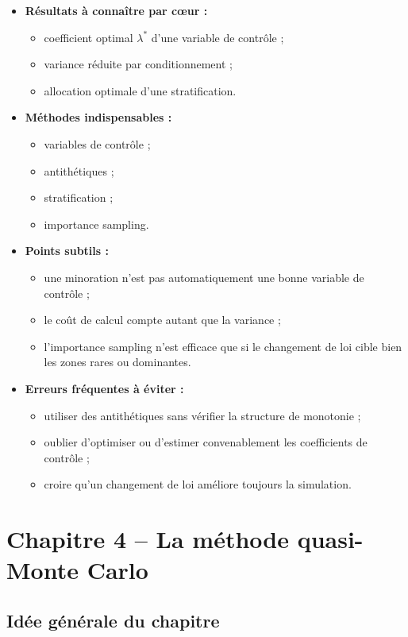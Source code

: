 \documentclass[11pt,a4paper]{article}
\begin{document}
\begin{itemize}
  \item \textbf{Résultats à connaître par cœur :}
  \begin{itemize}
    \item coefficient optimal $\lambda^\ast$ d'une variable de contrôle ;
    \item variance réduite par conditionnement ;
    \item allocation optimale d'une stratification.
  \end{itemize}
  \item \textbf{Méthodes indispensables :}
  \begin{itemize}
    \item variables de contrôle ;
    \item antithétiques ;
    \item stratification ;
    \item importance sampling.
  \end{itemize}
  \item \textbf{Points subtils :}
  \begin{itemize}
    \item une minoration n'est pas automatiquement une bonne variable de contrôle ;
    \item le coût de calcul compte autant que la variance ;
    \item l'importance sampling n'est efficace que si le changement de loi cible bien les zones rares ou dominantes.
  \end{itemize}
  \item \textbf{Erreurs fréquentes à éviter :}
  \begin{itemize}
    \item utiliser des antithétiques sans vérifier la structure de monotonie ;
    \item oublier d'optimiser ou d'estimer convenablement les coefficients de contrôle ;
    \item croire qu'un changement de loi améliore toujours la simulation.
  \end{itemize}
\end{itemize}

\section{Chapitre 4 -- La méthode quasi-Monte Carlo}

\subsection{Idée générale du chapitre}
\end{document}
